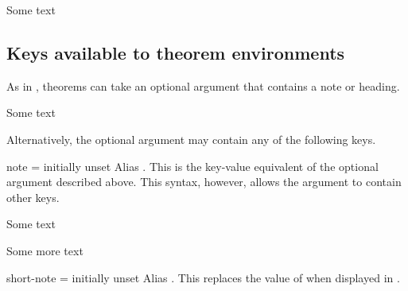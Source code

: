 \documentclass{ltxdoc}
\begin{document}
\begin{tcbwritetemp}
\end{tcbwritetemp}

\begin{keythmscode}[withpreamble]
\begin{theorem}
Some text
\end{theorem}
\end{keythmscode}

\subsection{Keys available to theorem environments} \label{in-doc-keys}

As in , theorems can take an optional argument that contains a note or heading.

\begin{keythmscode}[]
\begin{theorem}
Some text
\end{theorem}
\end{keythmscode}

Alternatively, the optional argument may contain any of the following keys.

\begin{docKey}{note}
  {=}
  {initially unset}
Alias . This is the key-value equivalent of the optional argument described above. This syntax, however, allows the argument to contain other keys.

\begin{keythmscode}[]
\begin{theorem}
Some text
\end{theorem}
\begin{theorem}[note=another heading]
Some more text
\end{theorem}
\end{keythmscode}

\end{docKey}

\begin{docKey}{short-note}
  {=}
  {initially unset}
Alias . This replaces the value of  when displayed in .
\end{docKey}

\end{document}
